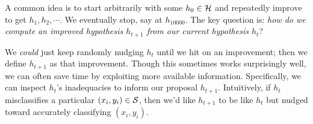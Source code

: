  A common idea is to start arbitrarily with some $h_0\in \mathcal{H}$ and
  repeatedly improve to get $h_1, h_2, \cdots$.  We eventually stop, say at $h_{10000}$.
  The key question is:
  \emph{how do we compute an improved hypothesis $h_{t+1}$ from our current
  hypothesis $h_t$}?

  We \emph{could} just keep randomly nudging $h_t$ until we hit on an
  improvement; then we define $h_{t+1}$ as that improvement.  Though this
  sometimes works surprisingly well, we can often save time by exploiting more available information.
  Specifically, we can inspect $h_t$'s inadequacies to inform our proposal
  $h_{t+1}$.
  Intuitively, if $h_t$ misclassifies a particular $(x_i, y_i) \in \mathcal{S}$, then
  we'd like $h_{t+1}$ to be like $h_t$ but nudged toward
  accurately classifying $(x_i, y_i)$.


